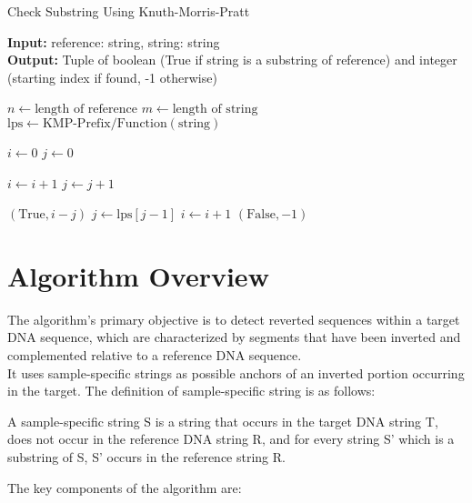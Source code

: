 \begin{algorithm}
\caption{Check Substring Using Knuth-Morris-Pratt}
\hspace*{\algorithmicindent} \textbf{Input:} reference: string, string: string \\
\hspace*{\algorithmicindent} \textbf{Output:} Tuple of boolean (True if string is a substring of reference) and integer (starting index if found, -1 otherwise)

\begin{algorithmic}[1]
\STATE $n \gets \text{length of reference}$
\STATE $m \gets \text{length of string}$
\STATE $\text{lps} \gets \text{KMP-Prefix/Function}(\text{string})$

\STATE $i \gets 0$ 
\STATE $j \gets 0$ 

        \STATE $i \gets i + 1$
        \STATE $j \gets j + 1$
    \ENDIF

        \RETURN $(\text{True}, i - j)$ 
            \STATE $j \gets \text{lps}[j - 1]$
        \ELSE
            \STATE $i \gets i + 1$
        \ENDIF
    \ENDIF
\ENDWHILE
\RETURN $(\text{False}, -1)$ 
\end{algorithmic}
\end{algorithm}




\section{Algorithm Overview}

The algorithm's primary objective is to detect reverted sequences within a target DNA sequence, which are characterized by segments that have been inverted and complemented relative to a reference DNA sequence. \\
It uses sample-specific strings as possible anchors of an inverted portion occurring in the target. The definition of sample-specific string is as follows:

\begin{definition}
A sample-specific string S is a string that occurs in the target DNA string T, does not occur in the reference DNA string R, and for every string S' which is a substring of S, S' occurs in the reference string R. 
\label{thm:sample_specific}
\end{definition} 
The key components of the algorithm are:

